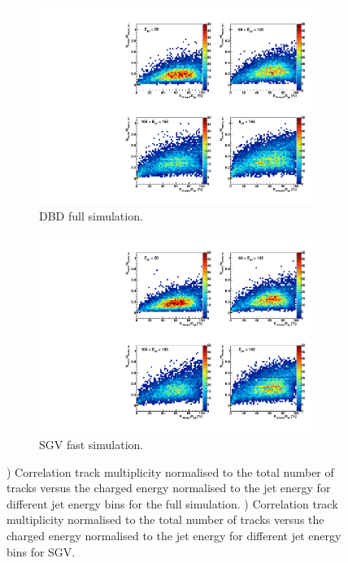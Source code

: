 \begin{figure}[t]
  \centering
  \begin{subfigure}[t]{0.45\textwidth}
    \centering
    \includegraphics[width=1\linewidth]{chap6/fig_SGV/Correlation_Ntrack_FracEchajet_full.pdf}
    \caption{DBD full simulation.} \label{fig:correlation_distrib_full}
  \end{subfigure}
  \hfill
  \begin{subfigure}[t]{0.45\textwidth}
    \centering
    \includegraphics[width=1\linewidth]{chap6/fig_SGV/Correlation_Ntrack_FracEchajet_sgv.pdf}
    \caption{SGV fast simulation.} \label{fig:correlation_distrib_sgv}
  \end{subfigure}
  \caption{) Correlation track multiplicity normalised to the total number of tracks versus the charged energy normalised to the jet energy for different jet energy bins for the full simulation. ) Correlation track multiplicity normalised to the total number of tracks versus the charged energy normalised to the jet energy for different jet energy bins for SGV.}
\end{figure}

